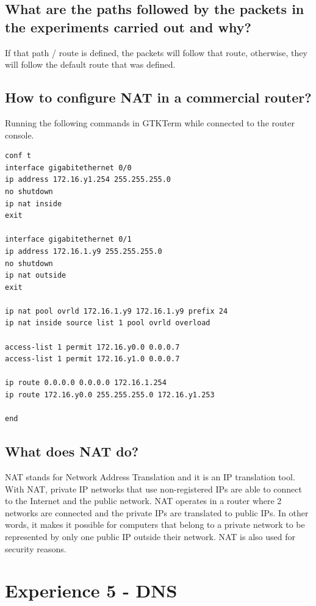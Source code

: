 \documentclass[11pt]{report}
\begin{document}
\subsection{What are the paths followed by the packets in the experiments carried out and why?}

If that path / route is defined, the packets will follow that route, otherwise, they will follow the default route that was defined. 

\subsection{How to configure NAT in a commercial router?}

Running the following commands in GTKTerm while connected to the router console.

\begin{verbatim}
conf t 
interface gigabitethernet 0/0  
ip address 172.16.y1.254 255.255.255.0 
no shutdown 
ip nat inside 
exit 

interface gigabitethernet 0/1 
ip address 172.16.1.y9 255.255.255.0 
no shutdown 
ip nat outside 
exit 

ip nat pool ovrld 172.16.1.y9 172.16.1.y9 prefix 24 
ip nat inside source list 1 pool ovrld overload 

access-list 1 permit 172.16.y0.0 0.0.0.7 
access-list 1 permit 172.16.y1.0 0.0.0.7 

ip route 0.0.0.0 0.0.0.0 172.16.1.254 
ip route 172.16.y0.0 255.255.255.0 172.16.y1.253 

end
\end{verbatim}

\subsection{What does NAT do?}

NAT stands for Network Address Translation and it is an IP translation tool. With NAT, private IP networks that use non-registered IPs are able to connect to the Internet and the public network. NAT operates in a router where 2 networks are connected and the private IPs are translated to public IPs. In other words, it makes it possible for computers that belong to a private network to be represented by only one public IP outside their network. NAT is also used for security reasons. 

\newpage

\section{Experience 5 - DNS}
\end{document}
